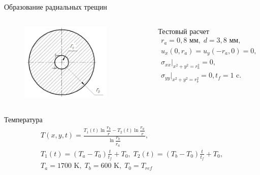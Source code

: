 \documentclass{beamer}
\begin{document}
\begin{frame}{Образование радиальных трещин}
	\begin{columns}
		\centering
		\begin{figure}[H]
			\centering
			\includegraphics[width=0.8\textwidth]{crack}
		\end{figure}
		\centering
		\begin{block}{Тестовый расчет}
			\[
			\begin{gathered}
			r_a = 0,8 \text{ мм},\;d = 3,8 \text{ мм},\\
				u_x(0,r_a) = u_y(-r_a,0)=0,\\ \sigma_{xx}\left.\right|_{x^2+y^2=r_a^2}=0,\\\sigma_{yy}\left.\right|_{x^2+y^2=r_b^2}=0,
				t_f=1 \text{ c}.
			\end{gathered}
			\]
		\end{block}
	\end{columns}
\begin{block}{Температура}
	\[
	\begin{gathered}
	T(x,y,t)=\frac{T_1(t)\ln\dfrac{r_b}{r}-T_2(t)\ln\dfrac{r_a}{r}}{\ln\dfrac{r_b}{r_a}}, \\
	T_1(t)=(T_a-T_0)\frac{t}{t_f}+T_0,\;T_2(t)=(T_b-T_0)\frac{t}{t_f}+T_0,\\T_a = 1700 \text{ K},\;T_b = 600 \text{ K},\;T_0=T_{ref}
	\end{gathered}
	\]
\end{block}	
\end{frame}
	
\end{document}
